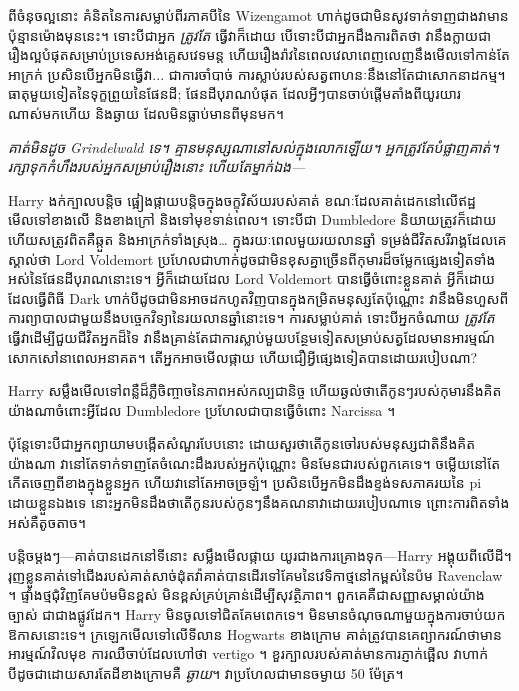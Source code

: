ពីចំនុចល្អនោះ គំនិតនៃការសម្លាប់ពីរភាគបីនៃ Wizengamot ហាក់ដូចជាមិនសូវទាក់ទាញជាងវាមានប៉ុន្មានម៉ោងមុននេះ។ ទោះបីជាអ្នក \emph{ត្រូវតែ} ធ្វើវាក៏ដោយ បើទោះបីជាអ្នកដឹងការពិតថា វានឹងក្លាយជារឿងល្អបំផុតសម្រាប់ប្រទេសអង់គ្លេសវេទមន្ត ហើយរឿងរ៉ាវនៃពេលវេលាពេញលេញនឹងមើលទៅកាន់តែអាក្រក់ ប្រសិនបើអ្នកមិនធ្វើវា... ជាការចាំបាច់ ការស្លាប់របស់សត្វពាហនៈនឹងនៅតែជាសោកនាដកម្ម។ ធាតុមួយទៀតនៃទុក្ខព្រួយនៃផែនដី; ផែនដីបុរាណបំផុត ដែលអ្វីៗបានចាប់ផ្តើមតាំងពីយូរយារណាស់មកហើយ និងឆ្ងាយ ដែលមិនធ្លាប់មានពីមុនមក។

\emph{គាត់មិនដូច Grindelwald ទេ។ គ្មាន​មនុស្ស​ណា​នៅ​សល់​ក្នុង​លោក​ឡើយ។ អ្នកត្រូវតែបំផ្លាញគាត់។ រក្សាទុកកំហឹងរបស់អ្នកសម្រាប់រឿងនោះ ហើយតែម្នាក់ឯង—}

Harry ងក់ក្បាលបន្តិច ផ្អៀងផ្កាយបន្តិចក្នុងចក្ខុវិស័យរបស់គាត់ ខណៈដែលគាត់ដេកនៅលើឥដ្ឋ មើលទៅខាងលើ និងខាងក្រៅ និងទៅមុខទាន់ពេល។ ទោះបីជា Dumbledore និយាយត្រូវក៏ដោយ ហើយសត្រូវពិតគឺឆ្កួត និងអាក្រក់ទាំងស្រុង… ក្នុងរយៈពេលមួយរយលានឆ្នាំ ទម្រង់ជីវិតសរីរាង្គដែលគេស្គាល់ថា Lord Voldemort ប្រហែលជាហាក់ដូចជាមិនខុសគ្នាច្រើនពីកុមារដ៏ចម្លែកផ្សេងទៀតទាំងអស់នៃផែនដីបុរាណនោះទេ។ អ្វីក៏ដោយដែល Lord Voldemort បានធ្វើចំពោះខ្លួនគាត់ អ្វីក៏ដោយដែលធ្វើពិធី Dark ហាក់បីដូចជាមិនអាចដកហូតវិញបានក្នុងកម្រិតមនុស្សតែប៉ុណ្ណោះ វានឹងមិនហួសពីការព្យាបាលជាមួយនឹងបច្ចេកវិទ្យានៃរយលានឆ្នាំនោះទេ។ ការសម្លាប់គាត់ ទោះបីអ្នកចំណាយ \emph{ត្រូវតែ} ធ្វើវាដើម្បីជួយជីវិតអ្នកដ៏ទៃ វានឹងគ្រាន់តែជាការស្លាប់មួយបន្ថែមទៀតសម្រាប់សត្វដែលមានអារម្មណ៍សោកសៅនាពេលអនាគត។ តើអ្នកអាចមើលផ្កាយ ហើយជឿអ្វីផ្សេងទៀតបានដោយរបៀបណា?

Harry សម្លឹងមើលទៅពន្លឺដ៏ភ្លឺចិញ្ចាចនៃភាពអស់កល្បជានិច្ច ហើយឆ្ងល់ថាតើកូនៗរបស់កុមារនឹងគិតយ៉ាងណាចំពោះអ្វីដែល Dumbledore ប្រហែលជាបានធ្វើចំពោះ Narcissa ។

ប៉ុន្តែទោះបីជាអ្នកព្យាយាមបង្កើតសំណួរបែបនោះ ដោយសួរថាតើកូនចៅរបស់មនុស្សជាតិនឹងគិតយ៉ាងណា វានៅតែទាក់ទាញតែចំណេះដឹងរបស់អ្នកប៉ុណ្ណោះ មិនមែនជារបស់ពួកគេទេ។ ចម្លើយនៅតែកើតចេញពីខាងក្នុងខ្លួនអ្នក ហើយវានៅតែអាចច្រឡំ។ ប្រសិនបើអ្នកមិនដឹងខ្ទង់ទសភាគរយនៃ pi ដោយខ្លួនឯងទេ នោះអ្នកមិនដឹងថាតើកូនរបស់កូនៗនឹងគណនាវាដោយរបៀបណាទេ ព្រោះការពិតទាំងអស់គឺតូចតាច។

\later

បន្តិចម្ដងៗ—គាត់បានដេកនៅទីនោះ សម្លឹងមើលផ្កាយ យូរជាងការគ្រោងទុក—Harry អង្គុយពីលើដី។ រុញខ្លួនគាត់ទៅជើងរបស់គាត់សាច់ដុំតវ៉ាគាត់បានដើរទៅគែមនៃវេទិកាថ្មនៅកម្ពស់នៃប៉ម Ravenclaw ។ ផ្ទាំងថ្មជុំវិញគែមប៉មមិនខ្ពស់ មិនខ្ពស់គ្រប់គ្រាន់ដើម្បីសុវត្ថិភាព។ ពួកគេគឺជាសញ្ញាសម្គាល់យ៉ាងច្បាស់ ជាជាងផ្លូវដែក។ Harry មិនចូលទៅជិតគែមពេកទេ។ មិនមានចំណុចណាមួយក្នុងការចាប់យកឱកាសនោះទេ។ ក្រឡេកមើលទៅលើទីលាន Hogwarts ខាងក្រោម គាត់ត្រូវបានគេព្យាករណ៍ថាមានអារម្មណ៍វិលមុខ ការឈឺចាប់ដែលហៅថា vertigo ។ ខួរក្បាលរបស់គាត់មានការភ្ញាក់ផ្អើល វាហាក់បីដូចជាដោយសារតែដីខាងក្រោមគឺ \emph{ឆ្ងាយ}។ វាប្រហែលជាមានចម្ងាយ 50 ម៉ែត្រ។

